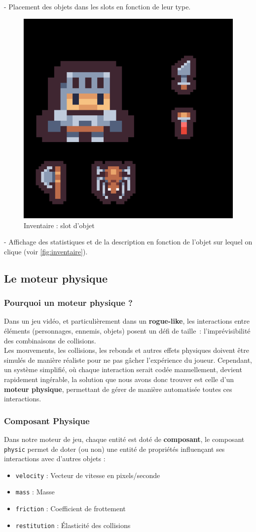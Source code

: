 \documentclass[a4paper,11pt]{article}
\begin{document}
   - Placement des objets dans les slots en fonction de leur type.

\begin{figure}[ht]
    \centering 
    \includegraphics[width=0.2\linewidth]{./img/itemslot.png} 
    \caption{Inventaire : slot d'objet} 
\end{figure}

   - Affichage des statistiques et de la description en fonction de l'objet sur lequel on clique (voir \autoref{fig:inventaire}).




\newpage

\subsection{Le moteur physique}

\subsubsection{Pourquoi un moteur physique ?}
\label{sec:moteur_physique}

Dans un jeu vidéo, et particulièrement dans un \textbf{rogue-like}, les interactions entre éléments (personnages, ennemis, objets) posent un défi de taille~: l'imprévisibilité des combinaisons de collisions. \\
Les mouvements, les collisions, les rebonds et autres effets physiques doivent être simulés de manière réaliste pour ne pas gâcher l’expérience du joueur. Cependant, un système simplifié, où chaque interaction serait codée manuellement, devient rapidement ingérable, la solution que nous avons donc trouver est celle d'un \textbf{moteur physique}, permettant de gérer de manière automatisée toutes ces interactions.

\subsubsection{Composant Physique}
\label{sec:structure_donnees}
Dans notre moteur de jeu, chaque entité est doté de \textbf{composant}, le composant \texttt{physic} permet de doter (ou non) une entité de propriétés influençant ses interactions avec d’autres objets :
\begin{itemize}
    \item \texttt{velocity} : Vecteur de vitesse en pixels/seconde
    \item \texttt{mass} : Masse
    \item \texttt{friction} : Coefficient de frottement
    \item \texttt{restitution} : Élasticité des collisions
\end{itemize}
\end{document}
